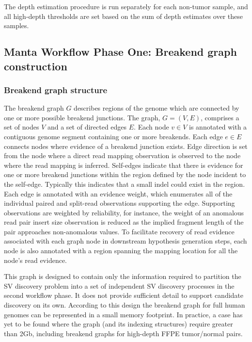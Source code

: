 \documentclass{article}
\begin{document}
The depth estimation procedure is run separately for each non-tumor sample, and all high-depth thresholds are set based on the sum of depth estimates over these samples.

\subsection{Manta Workflow Phase One: Breakend graph construction}

\subsubsection{Breakend graph structure}

The breakend graph $G$ describes regions of the genome which are connected by one or more possible breakend junctions. The graph, $G = (V, E)$, comprises a set of nodes $V$ and a set of directed edges $E$. Each node $v \in V$ is annotated with a contiguous genome segment containing one or more breakends. Each edge $e \in E$ connects nodes where evidence of a breakend junction exists. Edge direction is set from the node where a direct read mapping observation is observed to the node where the read mapping is inferred. Self-edges indicate that there is evidence for one or more breakend junctions within the region defined by the node incident to the self-edge. Typically this indicates that a small indel could exist in the region. Each edge is annotated with an evidence weight, which enumerates all of the individual paired and split-read observations supporting the edge. Supporting observations are weighted by reliability, for instance, the weight of an anomalous read pair insert size observation is reduced as the implied fragment length of the pair approaches non-anomalous values. To facilitate recovery of read evidence associated with each graph node in downstream hypothesis generation steps, each node is also annotated with a region spanning the mapping location for all the node's read evidence.

This graph is designed to contain only the information required to partition the SV discovery problem into a set of independent SV discovery processes in the second workflow phase. It does not provide sufficient detail to support candidate discovery on its own. According to this design the breakend graph for full human genomes can be represented in a small memory footprint. In practice, a case has yet to be found where the graph (and its indexing structures) require greater than 2Gb, including breakend graphs for high-depth FFPE tumor/normal pairs.
\end{document}
